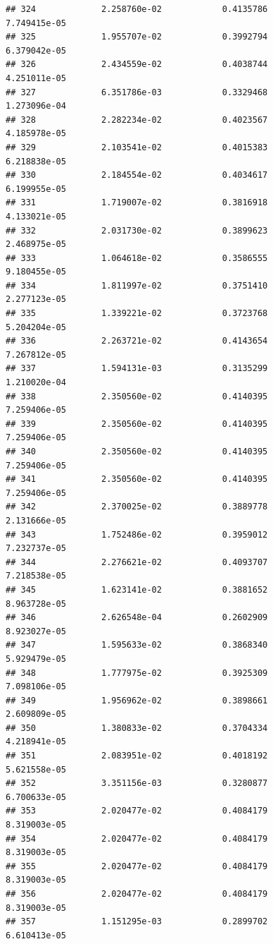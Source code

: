 \documentclass[
]{article}
\begin{document}
\begin{verbatim}
## 324             2.258760e-02            0.4135786            7.749415e-05
## 325             1.955707e-02            0.3992794            6.379042e-05
## 326             2.434559e-02            0.4038744            4.251011e-05
## 327             6.351786e-03            0.3329468            1.273096e-04
## 328             2.282234e-02            0.4023567            4.185978e-05
## 329             2.103541e-02            0.4015383            6.218838e-05
## 330             2.184554e-02            0.4034617            6.199955e-05
## 331             1.719007e-02            0.3816918            4.133021e-05
## 332             2.031730e-02            0.3899623            2.468975e-05
## 333             1.064618e-02            0.3586555            9.180455e-05
## 334             1.811997e-02            0.3751410            2.277123e-05
## 335             1.339221e-02            0.3723768            5.204204e-05
## 336             2.263721e-02            0.4143654            7.267812e-05
## 337             1.594131e-03            0.3135299            1.210020e-04
## 338             2.350560e-02            0.4140395            7.259406e-05
## 339             2.350560e-02            0.4140395            7.259406e-05
## 340             2.350560e-02            0.4140395            7.259406e-05
## 341             2.350560e-02            0.4140395            7.259406e-05
## 342             2.370025e-02            0.3889778            2.131666e-05
## 343             1.752486e-02            0.3959012            7.232737e-05
## 344             2.276621e-02            0.4093707            7.218538e-05
## 345             1.623141e-02            0.3881652            8.963728e-05
## 346             2.626548e-04            0.2602909            8.923027e-05
## 347             1.595633e-02            0.3868340            5.929479e-05
## 348             1.777975e-02            0.3925309            7.098106e-05
## 349             1.956962e-02            0.3898661            2.609809e-05
## 350             1.380833e-02            0.3704334            4.218941e-05
## 351             2.083951e-02            0.4018192            5.621558e-05
## 352             3.351156e-03            0.3280877            6.700633e-05
## 353             2.020477e-02            0.4084179            8.319003e-05
## 354             2.020477e-02            0.4084179            8.319003e-05
## 355             2.020477e-02            0.4084179            8.319003e-05
## 356             2.020477e-02            0.4084179            8.319003e-05
## 357             1.151295e-03            0.2899702            6.610413e-05

\end{verbatim}
\end{document}
